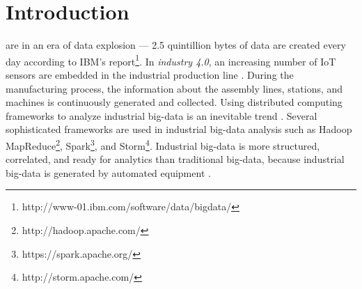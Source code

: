 \section{Introduction}\label{sec:introduction}
 are in an era of data explosion --- 2.5 quintillion bytes of data are created every day according to IBM's report\footnote{http://www-01.ibm.com/software/data/bigdata/}.
{\color{black}
In \textit{industry 4.0}, an increasing number of IoT sensors are embedded in the industrial production line \cite{lade2017manufacturing}.
During the manufacturing process, the information about the assembly lines, stations, and machines is continuously generated and collected.
Using distributed computing frameworks to analyze industrial big-data is an inevitable trend \cite{lee2014service}.
Several sophisticated frameworks are used in industrial big-data analysis such as Hadoop MapReduce\footnote{http://hadoop.apache.com/}, Spark\footnote{https://spark.apache.org/}, and Storm\footnote{http://storm.apache.com/}.
Industrial big-data is more structured, correlated, and ready for analytics than traditional big-data, because industrial big-data is generated by automated equipment \cite{basanta2018efficient, lv2017next}.
}

